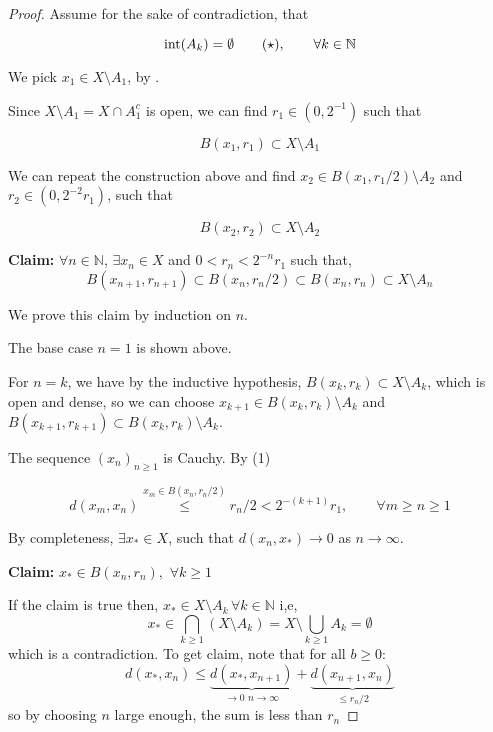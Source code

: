 \documentclass{article}
\begin{document}
    \begin{proof}
        Assume for the sake of contradiction, that

        \begin{equation*}
            \textrm{int}(A_k)=\emptyset \tag{$\star$}, \qquad \forall k \in \mathbb{N}
        \end{equation*}
        
        We pick $x_1\in X\setminus A_1$, by .
        
        Since $X\setminus A_1=X\cap A_1^c$ is open, we can find $r_1 \in (0,2^{-1})$ such that
        
        $$B(x_1,r_1)\subset X\setminus A_1$$  
        
        We can repeat the construction above and find $x_2\in B(x_1,r_1/2)\setminus A_2$ and $r_2 \in (0, 2^{-2} r_1)$, such that 
        
        $$B(x_2,r_2)\subset X\setminus A_2$$
        
        \textbf{Claim:} $\forall n \in \mathbb{N}$, $\exists x_n \in X$ and $0<r_n<2^{-n}r_1$ such that,  
        \begin{equation*}
            B(x_{n+1},r_{n+1})\subset B(x_n,r_n/2)\subset B(x_n,r_n)\subset X\setminus A_n
        \end{equation*}
            
        We prove this claim by induction on $n$.   
        
        The base case $n=1$ is shown above.    
        
        For $n=k$, we have by the inductive hypothesis, $B(x_k, r_k) \subset X \setminus A_k$, which is open and dense, so we can choose $x_{k+1} \in B(x_k, r_k) \setminus A_{k}$ and $B(x_{k+1}, r_{k+1}) \subset B(x_k, r_k) \setminus A_{k}$.  
        
        The sequence $(x_n)_{n \geq 1}$ is Cauchy. By (1)
        
        $$d(x_m,x_n)\stackrel{x_m\in B(x_n,r_n/2)}{\leq}r_n/2<2^{-(k+1)}r_1, \qquad \forall m\geq n\geq1$$
        
        By completeness, $\exists x_*\in X$, such that $d(x_n,x_*)\to0$ as $n\to \infty$.  
    
        \textbf{Claim:} $x_*\in B(x_n,r_n),\,\,\forall k\geq 1$  
        
        If the claim is true then,  $x_*\in X\setminus A_k\,\forall k \in \mathbb{N}$ i,e, 
        $$x_*\in\bigcap_{k\geq1}(X\setminus A_k)=X\setminus\bigcup_{k\geq1}A_k=\emptyset$$
        which is a contradiction. 
        To get claim, note that for all $b\geq0$:
        $$
        d(x_*,x_n)\leq \underbrace{{d(x_*,x_{n+1})}}_{\to0\,\,n\to\infty}+\underbrace{d(x_{n+1},x_n)}_{\leq r_n/2}
        $$
        so by choosing $n$ large enough, the sum is less than $r_n$
    \end{proof} 
\end{document}
